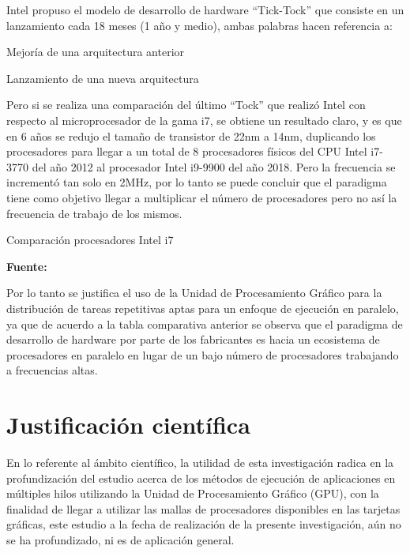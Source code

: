 \documentclass[../main/main.tex]{subfiles}
\begin{document}
  Intel propuso el modelo de desarrollo de hardware ``Tick-Tock'' que consiste en un lanzamiento cada 18 meses (1 año y medio), ambas palabras hacen referencia a:

  \begin{description}
    \item[Tick:] Mejoría de una arquitectura anterior
    \item[Tock:] Lanzamiento de una nueva arquitectura
  \end{description}

  Pero si se realiza una comparación del último ``Tock'' que realizó Intel con respecto al microprocesador de la gama i7, se obtiene un resultado claro, y es que en 6 años se redujo el tamaño de transistor de 22nm a 14nm, duplicando los procesadores para llegar a un total de 8 procesadores físicos del CPU Intel i7-3770 del año 2012 al procesador Intel i9-9900 del año 2018. Pero la frecuencia se incrementó tan solo en 2MHz, por lo tanto se puede concluir que el paradigma tiene como objetivo llegar a multiplicar el número de procesadores pero no así la frecuencia de trabajo de los mismos.

  \begin{table}[H]
    \centering
    \caption{Comparación procesadores Intel i7}
    
    \caption*{\textbf{Fuente:} \href{https://cpu.userbenchmark.com/Compare/Intel-Core-i9-9900K-vs-Intel-Core-i7-3770/4028vs1979}{\cite{web:i9_vs_i7}}}
  \end{table}

  Por lo tanto se justifica el uso de la Unidad de Procesamiento Gráfico para la distribución de tareas repetitivas aptas para un enfoque de ejecución en paralelo, ya que de acuerdo a la tabla comparativa anterior se observa que el paradigma de desarrollo de hardware por parte de los fabricantes es hacia un ecosistema de procesadores en paralelo en lugar de un bajo número de procesadores trabajando a frecuencias altas.

  \section{Justificación científica}

  En lo referente al ámbito científico, la utilidad de esta investigación radica en la profundización del estudio acerca de los métodos de ejecución de aplicaciones en múltiples hilos utilizando la Unidad de Procesamiento Gráfico (GPU), con la finalidad de llegar a utilizar las mallas de procesadores disponibles en las tarjetas gráficas, este estudio a la fecha de realización de la presente investigación, aún no se ha profundizado, ni es de aplicación general.
\end{document}
